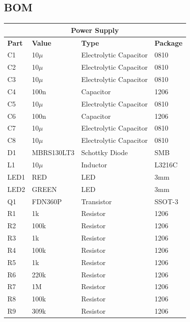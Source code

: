 \documentclass{article}
\begin{document}
 \subsection{BOM}
  \begin{center}
    \begin{tabular}{ |m{2em}|m{7em}|m{7em}|m{7em}|}
    \hline
	 \multicolumn{4}{|c|}{\textbf{Power Supply}} \\
	 \hline
       \textbf{Part} & \textbf{Value} & \textbf{Type} & \textbf{Package} \\ \hline
	C1 & 10$\mu$  & Electrolytic Capacitor & 0810 \\ \hline
	C2 & 10$\mu$  & Electrolytic Capacitor & 0810 \\ \hline
	C3 & 10$\mu$  & Electrolytic Capacitor & 0810 \\ \hline
	C4 & 100n & Capacitor & 1206 \\ \hline
	C5 & 10$\mu$  & Electrolytic Capacitor & 0810 \\ \hline
	C6 & 100n & Capacitor & 1206 \\ \hline
	C7 & 10$\mu$ & Electrolytic Capacitor & 0810 \\ \hline
	C8 & 10$\mu$ & Electrolytic Capacitor & 0810 \\ \hline
	
	D1 & MBRS130LT3 & Schottky Diode & SMB \\ \hline
	L1 & 10$\mu$ & Inductor & L3216C \\ \hline
	LED1 & RED  & LED & 3mm \\ \hline
	LED2 & GREEN & LED & 3mm \\ \hline
	Q1 & FDN360P & Transistor & SSOT-3\\ \hline
	
	R1 & 1k & Resistor & 1206 \\ \hline
	R2 & 100k & Resistor & 1206 \\ \hline
	R3 & 1k & Resistor & 1206 \\ \hline
	R4 & 100k & Resistor & 1206 \\ \hline
	R5 & 1k & Resistor & 1206 \\ \hline
	R6 & 220k & Resistor & 1206 \\ \hline
	R7 & 1M & Resistor & 1206 \\ \hline
	R8 & 100k & Resistor & 1206 \\ \hline
	R9 & 309k & Resistor & 1206 \\ \hline
	

\end{tabular}
\end{center}
\end{document}
